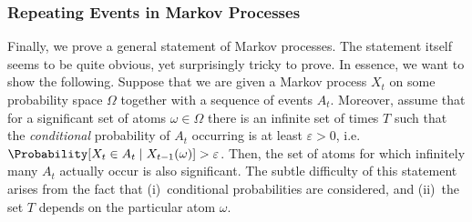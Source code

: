 \documentclass{theoretics}
\begin{document}
\subsubsection*{Repeating Events in Markov Processes}
Finally, we prove a general statement of Markov processes.
The statement itself seems to be quite obvious, yet surprisingly tricky to prove.
In essence, we want to show the following.
Suppose that we are given a Markov process $X_t$ on some probability space $\Omega$ together with a sequence of events $A_t$.
Moreover, assume that for a significant set of atoms $\omega \in \Omega$ there is an infinite set of times $T$ such that the \emph{conditional} probability of $A_t$ occurring is at least $\varepsilon > 0$, i.e.\ $\Probability[X_t \in A_t \mid X_{t-1}(\omega)] > \varepsilon$.
Then, the set of atoms for which infinitely many $A_t$ actually occur is also significant.
The subtle difficulty of this statement arises from the fact that (i)~conditional probabilities are considered, and (ii)~the set $T$ depends on the particular atom $\omega$.
\end{document}
